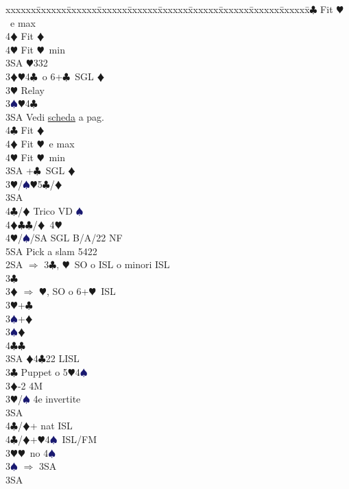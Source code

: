 \documentclass[a4paper,italian]{article}
\newcommand{\BC}{\textcolor{OliveGreen}{$\clubsuit$}}
\newcommand{\BD}{\textcolor{RedOrange}{$\vardiamondsuit$}}
\newcommand{\BH}{\textcolor{Red2}{$\varheartsuit${}}}
\newcommand{\BS}{\textcolor{MidnightBlue}{$\spadesuit${}}}
\newenvironment{bidtable}
{\begin{tabbing}

    xxxxxx\=xxxxxx\=xxxxxx\=xxxxxx\=xxxxxx\=xxxxxx\=xxxxxx\=xxxxxx\=xxxxxx\=xxxxxx\=\kill}
{\end{tabbing} }%
\begin{document}
\begin{multicols}{2}
\begin{bidtable}
        4\BC\> Fit \BH\ e max\\
        4\BD\> Fit \BD\\
        4\BH\> Fit \BH\ min\-\\
        3SA \BH 332\-\-\\
        3\BD {}\BH 4\BC\ o 6+\BC\ SGL \BD \+\\
        3\BH \> Relay\+\\
        3\BS {}\BH 4\BC\+\\
        3SA\> Vedi \hyperref[Riapertura3SA]{scheda} a pag. \pageref{Riapertura3SA}\\
        4\BC\> Fit \BD\\
        4\BD\> Fit \BH\ e max\\
        4\BH\> Fit \BH\ min\-\\
        3SA +\BC\ SGL \BD \-\-\\
        3\BH/\BS {}\BH 5\BC /\BD \+\\
        3SA\+\\
        4\BC/\BD \> Trico VD \BS \\
        4\BD\BC {}\BC /\BD\ 4\BH \\
        4\BH/\BS/SA\> \> SGL B/A/22 NF\\
        5SA \> Pick a slam 5422\-\-\-\-\\
        2SA \> $\Rightarrow$ 3\BC , \BH\ SO o ISL o minori ISL\+\\
        3\BC\+\\
        3\BD \> $\Rightarrow$ \BH , SO o 6+\BH\ ISL\\
        3\BH {}+\BC \+\\
        3\BS {}+\BD \-\\
        3\BS {}\BD \+\\
        4\BC {}\BC \-\\
        3SA \BD 4\BC 22 LISL\-\-\\
        3\BC \> Puppet o 5\BH 4\BS \+\\
        3\BD {}-2 4M\+\\
        3\BH/\BS \> 4e invertite\+\\
        3SA\+\\
        4\BC/\BD {}+ nat ISL\-\-\\
        4\BC/\BD {}+\BH4\BS\ ISL/FM\-\\
        3\BH {}\BH\ no 4\BS \+\\
        3\BS \> $\Rightarrow$ 3SA\+\\
        3SA\+\\

\end{bidtable}
\end{multicols}
\end{document}
